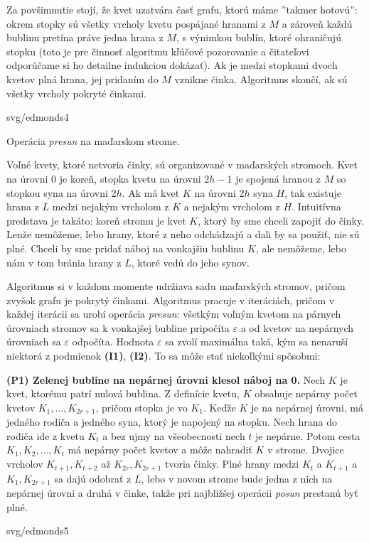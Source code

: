 \noindent
Za povšimnutie stojí, že kvet uzatvára časť grafu, ktorú máme ''takmer hotovú'': okrem stopky sú všetky vrcholy
kvetu pospájané hranami z $M$ a zároveň každú bublinu pretína práve jedna hrana z $M$,  s výnimkou bublín, 
ktoré ohraničujú stopku (toto je pre činnosť algoritmu kľúčové pozorovanie a čitateľovi odporúčame
si ho detailne indukciou dokázať).  Ak je medzi stopkami dvoch kvetov plná hrana, jej pridaním do $M$
vznikne činka. Algoritmus skončí, ak sú všetky vrcholy pokryté činkami.


\noindent
\begin{minipage}[t]{0.45\textwidth}
  \vskip 0pt
\begin{myfig}{\textwidth}{svg/edmonds4}
  \centerline{  Operácia {\em presun} na maďarskom strome.}
\end{myfig}
\end{minipage}
\hfill
\begin{minipage}[t]{0.5\textwidth}
  \vskip 0pt

  \noindent
  Voľné kvety, ktoré netvoria činky, 
sú organizované v maďarských stromoch. Kvet na úrovni 0 je koreň, stopka kvetu na úrovni $2h-1$ je spojená hranou 
z $M$ so stopkou syna na úrovni $2h$. Ak má kvet $K$ na úrovni $2h$ syna $H$, tak existuje
hrana z $L$ medzi nejakým vrcholom z $K$ a nejakým vrcholom z $H$. 
Intuitívna predstava je takáto:
koreň stromu je kvet $K$, ktorý by sme chceli zapojiť do činky. Lenže nemôžeme, lebo hrany, ktoré z neho odchádzajú
a dali by sa použiť,
nie sú plné. Chceli by sme pridať náboj na vonkajšiu bublinu $K$, ale nemôžeme, lebo nám v tom 
bránia hrany z $L$, ktoré vedú do jeho synov. 

\noindent
Algoritmus si v každom momente udržiava sadu maďarských stromov, pričom zvyšok  grafu je pokrytý činkami.
Algoritmus pracuje v iteráciách, pričom v každej iterácii sa urobí operácia {\em presun}: všetkým voľným 
kvetom na párnych úrovniach stromov sa k vonkajšej bubline pripočíta $\varepsilon$ a od kvetov na nepárnych
úrovniach sa $\varepsilon$ odpočíta. Hodnota $\varepsilon$ sa zvolí maximálna taká, kým sa nenaruší niektorá
z podmienok {\bf (I1)}, {\bf (I2)}.
To sa môže stať niekoľkými spôsobmi:
\end{minipage}

\noindent
{\bf (P1) Zelenej bubline na nepárnej úrovni klesol náboj na 0. } 
Nech $K$ je kvet, ktorému patrí nulová bublina. Z definície kvetu, $K$ obsahuje nepárny počet kvetov
$K_1,\ldots,K_{2r+1}$, pričom stopka je vo $K_1$. Keďže $K$ je na nepárnej úrovni, má jedného rodiča
a jedného syna, ktorý
je napojený na stopku. Nech hrana do rodiča ide z kvetu $K_t$ a bez ujmy na
všeobecnosti nech $t$ je nepárne. Potom cesta 
$K_1,K_2,\ldots,K_t$  má nepárny počet kvetov a môže nahradiť $K$ v strome.
Dvojice vrcholov $K_{t+1},K_{t+2}$ až $K_{2r},K_{2r+1}$ tvoria činky. Plné hrany 
medzi $K_t$ a $K_{t+1}$ a $K_1,K_{2r+1}$ sa dajú odobrať z $L$, lebo v novom strome bude jedna z nich na nepárnej
úrovni a druhá v činke, takže pri najbližšej operácii {\em posun} prestanú byť plné.
\begin{myfig}{0.8\textwidth}{svg/edmonds5}
\end{myfig}

